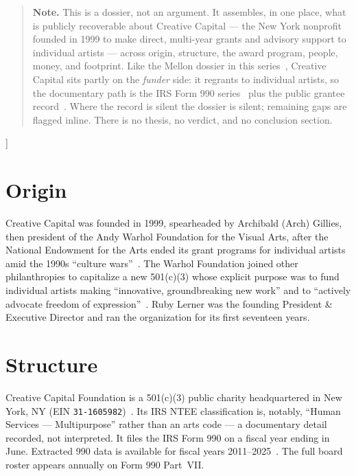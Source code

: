 \documentclass[10pt,letterpaper,twocolumn]{article}
\begin{document}
{\begin{quote}
\small\noindent\textbf{Note.} This is a dossier, not an argument. It assembles, in one place, what is publicly recoverable about Creative Capital --- the New York nonprofit founded in 1999 to make direct, multi-year grants and advisory support to individual artists --- across origin, structure, the award program, people, money, and footprint. Like the Mellon dossier in this series~\citep{ac2026mellon}, Creative Capital sits partly on the \emph{funder} side: it regrants to individual artists, so the documentary path is the IRS Form 990 series~\citep{ccpropublica} plus the public grantee record~\citep{cchistory}. Where the record is silent the dossier is silent; remaining gaps are flagged inline. There is no thesis, no verdict, and no conclusion section.
\end{quote}
\vspace{0.5em}
}]

\section{Origin}

Creative Capital was founded in 1999, spearheaded by Archibald (Arch) Gillies, then president of the Andy Warhol Foundation for the Visual Arts, after the National Endowment for the Arts ended its grant programs for individual artists amid the 1990s ``culture wars''~\citep{cchistory,ccwiki}. The Warhol Foundation joined other philanthropies to capitalize a new 501(c)(3) whose explicit purpose was to fund individual artists making ``innovative, groundbreaking new work'' and to ``actively advocate freedom of expression''~\citep{ccwiki}. Ruby Lerner was the founding President \& Executive Director and ran the organization for its first seventeen years.

\section{Structure}

Creative Capital Foundation is a 501(c)(3) public charity headquartered in New York, NY (EIN \texttt{31-1605982})~\citep{ccpropublica}. Its IRS NTEE classification is, notably, ``Human Services --- Multipurpose'' rather than an arts code --- a documentary detail recorded, not interpreted. It files the IRS Form 990 on a fiscal year ending in June. Extracted 990 data is available for fiscal years 2011--2025~\citep{ccpropublica}. The full board roster appears annually on Form 990 Part~VII.
\end{document}
